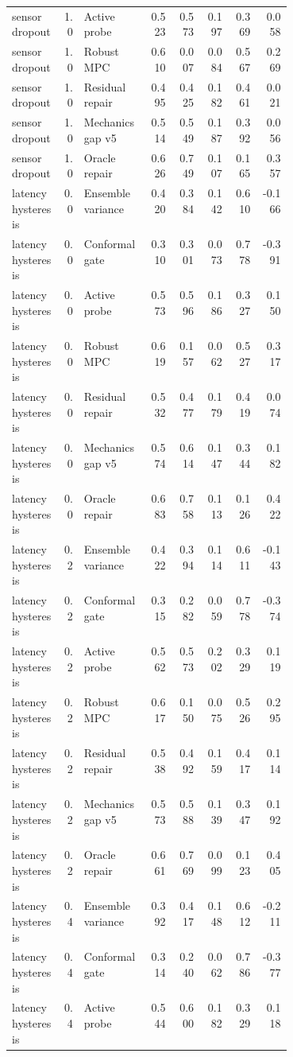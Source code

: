 \documentclass{article}
\begin{document}
\begin{center}
\begin{longtable}{p{0.18\linewidth}rp{0.23\linewidth}rrrrr}
sensor dropout & 1.0 & Active probe & 0.523 & 0.573 & 0.197 & 0.369 & 0.058\\
sensor dropout & 1.0 & Robust MPC & 0.610 & 0.007 & 0.084 & 0.567 & 0.269\\
sensor dropout & 1.0 & Residual repair & 0.495 & 0.425 & 0.182 & 0.461 & 0.021\\
sensor dropout & 1.0 & Mechanics gap v5 & 0.514 & 0.549 & 0.187 & 0.392 & 0.056\\
sensor dropout & 1.0 & Oracle repair & 0.626 & 0.749 & 0.107 & 0.165 & 0.357\\
latency hysteresis & 0.0 & Ensemble variance & 0.420 & 0.384 & 0.142 & 0.610 & -0.166\\
latency hysteresis & 0.0 & Conformal gate & 0.310 & 0.301 & 0.073 & 0.778 & -0.391\\
latency hysteresis & 0.0 & Active probe & 0.573 & 0.596 & 0.186 & 0.327 & 0.150\\
latency hysteresis & 0.0 & Robust MPC & 0.619 & 0.157 & 0.062 & 0.527 & 0.317\\
latency hysteresis & 0.0 & Residual repair & 0.532 & 0.477 & 0.179 & 0.419 & 0.074\\
latency hysteresis & 0.0 & Mechanics gap v5 & 0.574 & 0.614 & 0.147 & 0.344 & 0.182\\
latency hysteresis & 0.0 & Oracle repair & 0.683 & 0.758 & 0.113 & 0.126 & 0.422\\
latency hysteresis & 0.2 & Ensemble variance & 0.422 & 0.394 & 0.114 & 0.611 & -0.143\\
latency hysteresis & 0.2 & Conformal gate & 0.315 & 0.282 & 0.059 & 0.778 & -0.374\\
latency hysteresis & 0.2 & Active probe & 0.562 & 0.573 & 0.202 & 0.329 & 0.119\\
latency hysteresis & 0.2 & Robust MPC & 0.617 & 0.150 & 0.075 & 0.526 & 0.295\\
latency hysteresis & 0.2 & Residual repair & 0.538 & 0.492 & 0.159 & 0.417 & 0.114\\
latency hysteresis & 0.2 & Mechanics gap v5 & 0.573 & 0.588 & 0.139 & 0.347 & 0.192\\
latency hysteresis & 0.2 & Oracle repair & 0.661 & 0.769 & 0.099 & 0.123 & 0.405\\
latency hysteresis & 0.4 & Ensemble variance & 0.392 & 0.417 & 0.148 & 0.612 & -0.211\\
latency hysteresis & 0.4 & Conformal gate & 0.314 & 0.240 & 0.062 & 0.786 & -0.377\\
latency hysteresis & 0.4 & Active probe & 0.544 & 0.600 & 0.182 & 0.329 & 0.118\\

\end{longtable}
\end{center}
\end{document}
